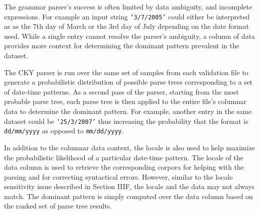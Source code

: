 The grammar parser's success is often limited by data ambiguity, and incomplete expressions. For example an input string \texttt{`3/7/2005'} could either be interpreted as as the 7th day of March or the 3rd day of July depending on the date format used. While a single entry cannot resolve the parser's ambiguity, a column of data provides more context for determining the dominant pattern prevalent in the dataset. 

The CKY parser is run over the same set of samples from each validation file to generate a probabilistic distribution of possible parse trees corresponding to a set of date-time patterns. As a second pass of the parser, starting from the most probable parse tree, each parse tree is then applied to the entire file's columnar data to determine the dominant pattern. For example, another entry in the same dataset could be \texttt{`25/3/2007'} thus increasing the probability that the format is \texttt{dd/mm/yyyy} as opposed to \texttt{mm/dd/yyyy}.

In addition to the columnar data context, the locale is also used to help maximize the probabilistic likelihood of a particular date-time pattern. The locale of the data column is used to retrieve the corresponding corpora for helping with the parsing and for correcting syntactical errors. However, similar to the locale sensitivity issue described in Section IIIF, the locale and the data may not always match. The dominant pattern is simply computed over the data column based on the ranked set of parse tree results.
